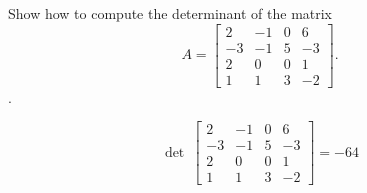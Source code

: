 
\begin{exerciseStatement}


Show how to compute the determinant of the matrix \[A= \left[\begin{array}{cccc}
2 & -1 & 0 & 6 \\
-3 & -1 & 5 & -3 \\
2 & 0 & 0 & 1 \\
1 & 1 & 3 & -2
\end{array}\right] .\].


\end{exerciseStatement}
    
\begin{exerciseAnswer} 
\[\operatorname{det}\  \left[\begin{array}{cccc}
2 & -1 & 0 & 6 \\
-3 & -1 & 5 & -3 \\
2 & 0 & 0 & 1 \\
1 & 1 & 3 & -2
\end{array}\right] = -64 \]
\end{exerciseAnswer}
    
